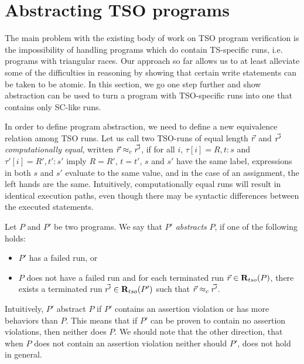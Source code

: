 \section{Abstracting TSO programs}
\label{sec:abstracting-tso-programs}
The main problem with the existing body of work on TSO program verification is the impossibility of handling programs which do contain TS-specific runs, i.e. programs with triangular races.
Our approach so far allows us to at least alleviate some of the difficulties in reasoning by showing that certain write statements can be taken to be atomic.
In this section, we go one step further and show abstraction can be used to turn a program with TSO-specific runs into one that contains only SC-like runs.

In order to define program abstraction, we need to define a new equivalence relation among TSO runs.
Let us call two TSO-runs of equal length $\vec{r}$ and $\vec{r'}$ {\em computationally equal}, written $\vec{r} \approx_c \vec{r'}$, if for all $i$, $\tau[i]=R,t:s$ and $\tau'[i]=R',t':s'$  imply $R=R'$, $t=t'$, $s$ and $s'$ have the same label, expressions in both $s$ and $s'$ evaluate to the same value, and in the case of an assignment, the left hands are the same.
Intuitively, computationally equal runs will result in identical execution paths, even though there may be syntactic differences between the executed statements.
\begin{definition}
Let $P$ and $P'$ be two programs.
We say that $P'$ {\em abstracts} $P$, if one of the following holds:
\begin{itemize}
\item $P'$ has a failed run, or
\item $P$ does not have a failed run and for each terminated run $\vec{r}\in\mathbf{R}_{tso}(P)$, there exists a terminated run $\vec{r'}\in\mathbf{R}_{tso}(P')$ such that $\vec{r}\approx_c \vec{r'}$.
\end{itemize}
\end{definition}
Intuitively, $P'$ abstract $P$ if $P'$ contains an assertion violation or has more behaviors than $P$.
This means that if $P'$ can be proven to contain no assertion violations, then neither does $P$.
We should note that the other direction, that when $P$ does not contain an assertion violation neither should $P'$, does not hold in general.

